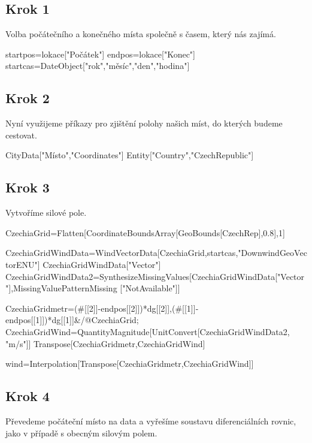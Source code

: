 \documentclass[reqno, a4paper]{amsart}
\begin{document}
\subsection*{Krok 1}
Volba počátečního a konečného místa společně s časem, který nás zajímá.
\begin{verbatim*}
	startpos=lokace["Počátek"]
	endpos=lokace["Konec"]
	startcas=DateObject[{"rok","měsíc","den","hodina"}]
\end{verbatim*}
\subsection*{Krok 2}
Nyní využijeme příkazy pro zjištění polohy našich míst, do kterých budeme cestovat.
\begin{verbatim*}
	CityData["Místo","Coordinates"]
	Entity["Country","CzechRepublic"]
\end{verbatim*}
\subsection*{Krok 3}
Vytvoříme silové pole.
\begin{verbatim*}
	CzechiaGrid=Flatten[CoordinateBoundsArray[GeoBounds[CzechRep],0.8],1]
	
	CzechiaGridWindData=WindVectorData[CzechiaGrid,startcas,"DownwindGeoVectorENU"]
	CzechiaGridWindData["Vector"]
	CzechiaGridWindData2=SynthesizeMissingValues[CzechiaGridWindData["Vector"],MissingValuePatternMissing
	["NotAvailable"]]
	
	CzechiaGridmetr={(#[[2]]-endpos[[2]])*dg[[2]],(#[[1]]-endpos[[1]])*dg[[1]]}&/@CzechiaGrid;
	CzechiaGridWind=QuantityMagnitude[UnitConvert[CzechiaGridWindData2, "m/s"]]
	Transpose[{CzechiaGridmetr,CzechiaGridWind}]
	
	wind=Interpolation[Transpose[{CzechiaGridmetr,CzechiaGridWind}]]
\end{verbatim*}
\subsection*{Krok 4}
Převedeme počáteční místo na data a vyřešíme soustavu diferenciálních rovnic, jako v případě s obecným silovým polem.
\begin{verbatim*}
	x0={((startpos-endpos)*dg)[[2]],((startpos-endpos)*dg)[[1]]}
	
	sol=ParametricNDSolve[Join[eqs,{x[0]==x0[[1]],y[0]==x0[[2]],\[Beta][0]==\[Beta]0}],{x,y,\[Beta]},
	{t,0,16*3600},{\[Beta]0}]...
\end{verbatim*}
\end{document}
